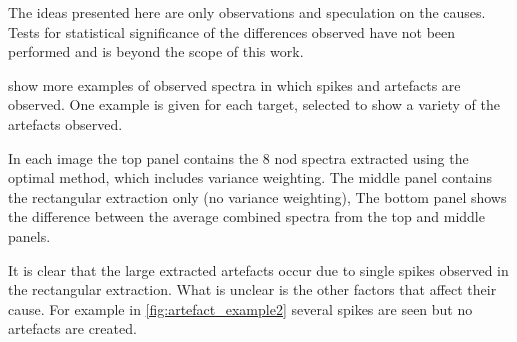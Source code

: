 The ideas presented here are only observations and speculation on the causes.
Tests for statistical significance of the differences observed have not been performed and is beyond the scope of this work.

 show more examples of observed spectra in which spikes and artefacts are observed.
One example is given for each target, selected to show a variety of the artefacts observed.

In each image the top panel contains the 8 nod spectra extracted using the optimal method, which includes variance weighting.
The middle panel contains the rectangular extraction only (no variance weighting), The bottom panel shows the difference between the average combined spectra from the top and middle panels.

It is clear that the large extracted artefacts occur due to single spikes observed in the rectangular extraction.
What is unclear is the other factors that affect their cause.
For example in \cref{fig:artefact_example2} several spikes are seen but no artefacts are created.


